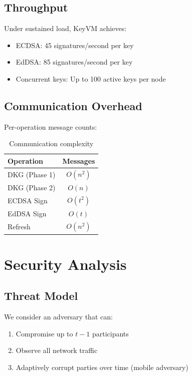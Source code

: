 \documentclass[11pt,twocolumn]{article}
\begin{document}
\subsection{Throughput}

Under sustained load, KeyVM achieves:

\begin{itemize}
\item ECDSA: 45 signatures/second per key
\item EdDSA: 85 signatures/second per key
\item Concurrent keys: Up to 100 active keys per node
\end{itemize}

\subsection{Communication Overhead}

Per-operation message counts:

\begin{table}[h]
\centering
\begin{tabular}{|l|c|}
\hline
\textbf{Operation} & \textbf{Messages} \\
\hline
DKG (Phase 1) & $O(n^2)$ \\
DKG (Phase 2) & $O(n)$ \\
ECDSA Sign & $O(t^2)$ \\
EdDSA Sign & $O(t)$ \\
Refresh & $O(n^2)$ \\
\hline
\end{tabular}
\caption{Communication complexity}
\end{table}

\section{Security Analysis}

\subsection{Threat Model}

We consider an adversary that can:

\begin{enumerate}
\item Compromise up to $t-1$ participants
\item Observe all network traffic
\item Adaptively corrupt parties over time (mobile adversary)
\end{enumerate}
\end{document}
